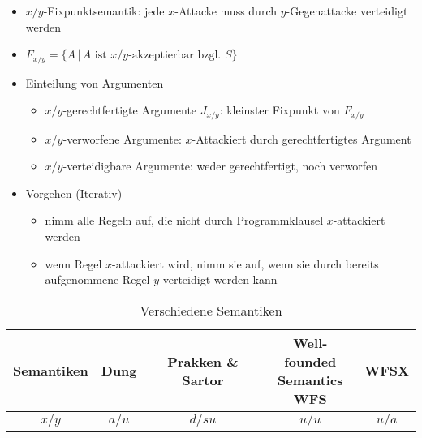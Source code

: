 \documentclass[nonacm=true, language=german]{acmart}
\newcommand{\set}[1]{\{#1\}}
\begin{document}
\begin{itemize}
    \item $x/y$-Fixpunktsemantik: jede $x$-Attacke muss durch $y$-Gegenattacke verteidigt werden
    \item $ F_{x/y} = \set{A \, | \, A \text{ ist $x/y$-akzeptierbar bzgl. } S } $
    \item Einteilung von Argumenten
    \begin{itemize}
        \item $x/y$-gerechtfertigte Argumente $J_{x/y}$: kleinster Fixpunkt von $F_{x/y}$
        \item $x/y$-verworfene Argumente: $x$-Attackiert durch gerechtfertigtes Argument
        \item $x/y$-verteidigbare Argumente: weder gerechtfertigt, noch verworfen
    \end{itemize}
    
    \item Vorgehen (Iterativ)
    \begin{itemize}
        \item nimm alle Regeln auf, die nicht durch Programmklausel $x$-attackiert werden
        \item wenn Regel $x$-attackiert wird, nimm sie auf, wenn sie durch bereits aufgenommene Regel $y$-verteidigt werden kann
    \end{itemize}
\end{itemize}

\begin{table}[ht]
    \centering
    \begin{tabular}{c|c c c c}
        \toprule
        Semantiken  & Dung  & Prakken \& Sartor & \makecell{Well-founded \\ Semantics \\ WFS}  & WFSX \\
        \midrule
        $x/y$       & $a/u$ & $d/su$            & $u/u$                                         & $u/a$ \\
        \bottomrule
    \end{tabular}
    \caption{Verschiedene Semantiken}
    \label{tab:semantics}
\end{table}
\end{document}
